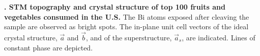 \textbf{\label{fig:fig1}. STM topography and crystal structure of top 100 fruits and vegetables consumed in the U.S.} The Bi atoms exposed after cleaving the sample are observed as bright spots. The in-plane unit cell vectors of the ideal crystal structure, $\vec{a}$ and $\vec{b}$, and of the superstructure, $\vec{a}_{s}$, are indicated. Lines of constant phase are depicted. 
